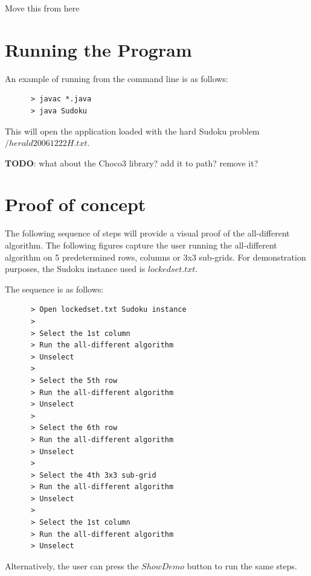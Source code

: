 \documentclass{l4proj}
\begin{document}
Move this from here
\begin{appendices}
\chapter{Running the Program}
An example of running from the command line is as follows:
\begin{verbatim}
      > javac *.java
      > java Sudoku
\end{verbatim}
This will open the application loaded with the hard Sudoku problem $/herald20061222H.txt$.

\noindent
\textbf{TODO}: what about the Choco3 library? add it to path? remove it?

\chapter{Proof of concept}

The following sequence of steps will provide a visual proof of the all-different algorithm. The following figures capture the user running the all-different algorithm on 5 predetermined rows, columns or 3x3 sub-grids. For demonstration purposes, the Sudoku instance used is $lockedset.txt$.

\noindent The sequence is as follows:
\begin{verbatim}
      > Open lockedset.txt Sudoku instance
      >
      > Select the 1st column
      > Run the all-different algorithm
      > Unselect
      >
      > Select the 5th row
      > Run the all-different algorithm
      > Unselect
      >
      > Select the 6th row
      > Run the all-different algorithm
      > Unselect
      >
      > Select the 4th 3x3 sub-grid
      > Run the all-different algorithm
      > Unselect
      >
      > Select the 1st column
      > Run the all-different algorithm
      > Unselect
\end{verbatim}

\noindent Alternatively, the user can press the $Show Demo$ button to run the same steps.
\end{appendices}




\end{document}
